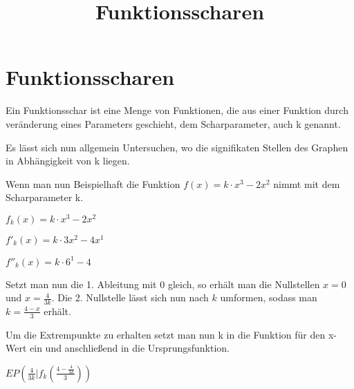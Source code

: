 \documentclass[10pt,a4paper]{article}
\begin{document}
\setlength{\parindent}{0cm}

\title{Funktionsscharen}

\makeatletter
\def\@maketitle{%
  \newpage
  \null
  \vskip 2em%
  \begin{center}%
  \let \footnote \thanks
    {\Huge\bfseries\@title \par}%
    \vskip 1.5em%
    {\large
      \lineskip .5em%
      \begin{tabular}[t]{c}%
        \@author
      \end{tabular}\par}%
    \vskip 1em%
    {\large \@date}%
  \end{center}%
  \par
  \vskip 1.5em}
\makeatother

\author{}
\date{}

\maketitle

\section*{Funktionsscharen}

Ein Funktionsschar ist eine Menge von Funktionen, die aus einer Funktion durch veränderung
eines Parameters geschieht, dem Scharparameter, auch k genannt.

Es lässt sich nun allgemein Untersuchen, wo die signifikaten Stellen des Graphen in Abhängigkeit
von k liegen.

Wenn man nun Beispielhaft die Funktion $f(x) = k \cdot x^3 - 2x^2$ nimmt mit dem Scharparameter k.

$f_{k}(x) = k \cdot x^3 - 2x^2$

$f'_{k}(x) = k \cdot 3x^2 - 4x^1$

$f''_{k}(x) = k \cdot 6^1 - 4$

Setzt man nun die 1. Ableitung mit 0 gleich, so erhält man die Nullstellen $x = 0$ und $x = \frac{4}{3k}$.
Die 2. Nullstelle lässt sich nun nach $k$ umformen, sodass man $k = \frac{4 - x}{3}$ erhält.

Um die Extrempunkte zu erhalten setzt man nun k in die Funktion für den x-Wert ein
und anschließend in die Ursprungsfunktion.

$EP(\frac{4}{3k}|f_{k}(\frac{4 - \frac{4}{3k}}{3}))$
\end{document}
